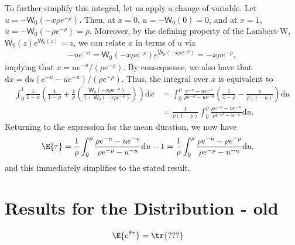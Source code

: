 To further simplify this integral, let us apply a change of variable. Let $u = - \mathsf{W}_0(-x\rho e^{-\rho})$. Then, at $x=0$, $u = -\mathsf{W}_0(0) = 0$, and at $x=1$, $u = -\mathsf{W}_0(-\rho e^{-\rho}) = \rho$. Moreover, by the defining property of the Lambert-W, $\mathsf{W}_0(z) e^{\mathsf{W}_0(z)} = z$, we can relate $x$ in terms of $u$ via
\begin{align}
-u e^{-u} = \mathsf{W}_0(-x\rho e^{-\rho}) e^{\mathsf{W}_0(-x\rho e^{-\rho})} = - x \rho e^{-\rho}
,
\end{align}
implying that $x = u e^{-u} / (\rho e^{-\rho})$. By consequence, we also have that $\mathrm{d}x = \mathrm{d}u (e^{-u} - u e^{-u})/(\rho e^{-\rho})$. Thus, the integral over $x$ is equivalent to
\begin{align}
\int_0^1\frac{1}{1-x}\left(\frac{1}{1-\rho} +  \frac{1}{\rho}
\left(
\frac{\mathsf{W}_0\left(-x \rho e^{-\rho}\right)}
{1 + \mathsf{W}_0\left(-x \rho e^{-\rho}\right)}
\right)\right)\mathrm{d}x
&=
\int_0^\rho
\frac{e^{-u} - u e^{-u}}{\rho e^{-\rho} - u e^{-u}}
\left(
\frac{1}{1-\rho}
-
\frac{u}{\rho(1-u)}
\right)
\mathrm{d}u
\\
&=
\frac{1}{\rho(1-\rho)}
\int_0^\rho
\frac{\rho e^{-u} - u e^{-u}}{\rho e^{-\rho} - u^{-u}} \mathrm{d}u
.
\end{align}
Returning to the expression for the mean duration, we now have
\begin{align}
\E{\tau}
&=
\frac{1}{\rho}
\int_0^\rho
\frac{\rho e^{-u} - u e^{-u}}{\rho e^{-\rho} - u^{-u}} 
\mathrm{d}u
-
1
=
\frac{1}{\rho}
\int_0^\rho
\frac{\rho e^{-u} - \rho e^{-\rho}}{\rho e^{-\rho} - u^{-u}} 
\mathrm{d}u
,
\end{align}
and this immediately simplifies to the stated result.
\hfill\Halmos\endproof

\section{Results for the Distribution - old}



\begin{theorem}
\begin{align}
\E{e^{\theta \tau}}
&=
\tr{???}
\end{align}
\end{theorem}
